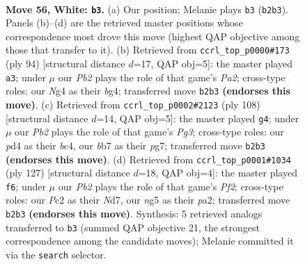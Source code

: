 \documentclass[11pt]{article}
\begin{document}
\clearpage

\begin{figure}[p]\centering
\begin{subfigure}{0.46\textwidth}\centering
\resizebox{\linewidth}{!}{%
\newchessgame
\chessboard[
  setfen={8/kb6/8/6n1/p2p2N1/P5P1/1PP5/1K6 w - - 30 56},
  showmover=false,
  pgfstyle=straightmove, color=movearrow, markmove={b2-b3}
]}
\caption{}
\end{subfigure}\hfill
\begin{subfigure}{0.46\textwidth}\centering
\resizebox{\linewidth}{!}{%
\newchessgame
\chessboard[
  setfen={8/1k6/8/p3P3/1p4b1/1P6/P1P5/1K6 w - - 0 48},
  showmover=false,
  pgfstyle=straightmove, color=movearrow, markmove={a2-a3}
]}
\caption{}
\end{subfigure}
\\[4pt]
\begin{subfigure}{0.46\textwidth}\centering
\resizebox{\linewidth}{!}{%
\newchessgame
\chessboard[
  setfen={5k2/2N3p1/8/4p2p/2b1P2P/5KP1/8/8 w - - 1 55},
  showmover=false,
  pgfstyle=straightmove, color=movearrow, markmove={g3-g4}
]}
\caption{}
\end{subfigure}\hfill
\begin{subfigure}{0.46\textwidth}\centering
\resizebox{\linewidth}{!}{%
\newchessgame
\chessboard[
  setfen={8/p2nkp2/6p1/3K2P1/5P2/8/P3B3/8 b - - 18 64},
  showmover=false,
  pgfstyle=straightmove, color=movearrow, markmove={f7-f6}
]}
\caption{}
\end{subfigure}
\caption{\textbf{Move 56, White: \texttt{b3}.} (a) Our position; Melanie plays \texttt{b3} (\texttt{b2b3}). Panels (b)--(d) are the retrieved master positions whose correspondence most drove this move (highest QAP objective among those that transfer to it). (b) Retrieved from \texttt{ccrl\_top\_p0000\#173} (ply 94) [structural distance $d$=17, QAP obj=5]: the master played \texttt{a3}; under $\mu$ our \emph{Pb2} plays the role of that game's \emph{Pa2}; cross-type roles: our \emph{N}g4 as their \emph{b}g4; transferred move \texttt{b2b3} \textbf{(endorses this move)}. (c) Retrieved from \texttt{ccrl\_top\_p0002\#2123} (ply 108) [structural distance $d$=14, QAP obj=5]: the master played \texttt{g4}; under $\mu$ our \emph{Pb2} plays the role of that game's \emph{Pg3}; cross-type roles: our \emph{p}d4 as their \emph{b}c4, our \emph{b}b7 as their \emph{p}g7; transferred move \texttt{b2b3} \textbf{(endorses this move)}. (d) Retrieved from \texttt{ccrl\_top\_p0001\#1034} (ply 127) [structural distance $d$=18, QAP obj=4]: the master played \texttt{f6}; under $\mu$ our \emph{Pb2} plays the role of that game's \emph{Pf2}; cross-type roles: our \emph{P}c2 as their \emph{N}d7, our \emph{n}g5 as their \emph{p}a2; transferred move \texttt{b2b3} \textbf{(endorses this move)}. Synthesis: 5 retrieved analogs transferred to \texttt{b3} (summed QAP objective 21, the strongest correspondence among the candidate moves); Melanie committed it via the \texttt{search} selector.}
\label{fig:thought-m110}
\end{figure}
\end{document}

